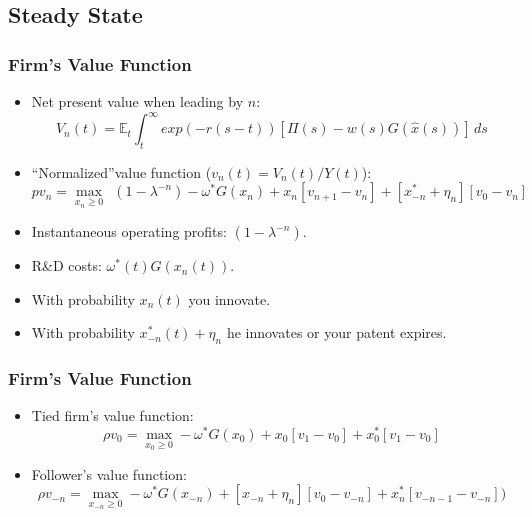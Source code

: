 \documentclass{beamer}
\begin{document}
\subsection{Steady State}
\label{sub:steady_state}
\begin{frame}[t]\frametitle{Firm's Value Function} 
  \begin{itemize}
    \item<+-> Net present value when leading by $n$:
      \begin{equation*}
        V_n(t) = \mathbb{E}_t \int_{t}^{\infty} exp(-r(s - t))[\Pi(s) - w(s)G(\hat{x}(s))]\,ds 
      \end{equation*}
    \item<+-> ``Normalized''value function ($v_n(t) = V_n(t) / Y(t)$):
      \begin{equation*} \label{eq:rvf_leader}  %
          pv_n = \max_{x_n \geq 0}\ \ (1 - \lambda^{-n}) - \omega^*G(x_n) + x_n[v_{n+1} - v_n] + [x_{-n}^* + \eta_n][v_0 - v_n]
        \end{equation*}
    \item<+-> Instantaneous operating profits: $(1 - \lambda^{-n})$.
    \item<+-> R\&D costs: $\omega^*(t)G(x_n(t))$.
    \item<+-> With probability $x_n(t)$ you innovate.
    \item<+-> With probability $x_{-n}^*(t) + \eta_n$ he innovates or your patent expires.
  \end{itemize}
\end{frame}

\begin{frame}[t]\frametitle{Firm's Value Function} 
  \begin{itemize}
    \item<+-> Tied firm's value function:
      \begin{equation*} \label{eq:rvf_tied}
        \rho v_0 = \max_{x_0 \geq 0} -\omega^*G(x_{0}) + x_{0}[v_1 - v_0] + x_0^*[v_{1} - v_0]
      \end{equation*}

    \item<+-> Follower's value function:
      \begin{equation*} \label{eq:rvf_follower}
        \rho v_{-n} = \max_{x_{-n} \geq 0} -\omega^*G(x_{-n}) + [x_{-n} + \eta_n][v_0 - v_{-n}] + x_n^*[v_{-n-1} - v_{-n}])
      \end{equation*}
  \end{itemize}
\end{frame}
\end{document}
